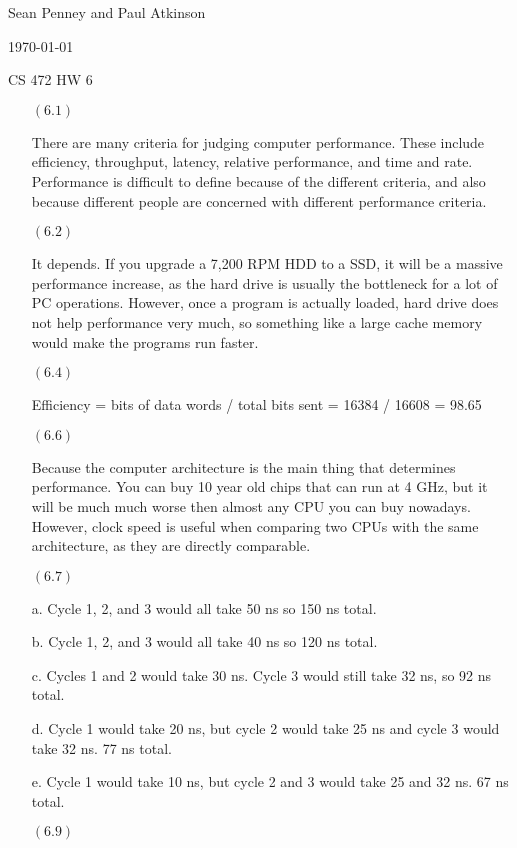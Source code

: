 \documentclass[letterpaper,10pt,titlepage]{article}
\def\name{Sean Penney and Paul Atkinson}
\begin{document}
\hfill \name

\hfill \today

\hfill CS 472 HW 6

\begin{enumerate}
\item[$(6.1)$] 

  There are many criteria for judging computer performance.
  These include efficiency, throughput, latency, relative performance, and time and rate.
  Performance is difficult to define because of the different criteria, and also because different people are concerned with different performance criteria.

\item[$(6.2)$]

  It depends. If you upgrade a 7,200 RPM HDD to a SSD, it will be a massive performance increase, as the hard drive is usually the bottleneck for a lot of PC operations.
  However, once a program is actually loaded, hard drive does not help performance very much, so something like a large cache memory would make the programs run faster.

\item[$(6.4)$]

  Efficiency = bits of data words / total bits sent = 16384 / 16608 = 98.65%
  
\item[$(6.6)$]

  Because the computer architecture is the main thing that determines performance. You can buy 10 year old chips that can run at 4 GHz, but it will be much much worse then 
  almost any CPU you can buy nowadays. However, clock speed is useful when comparing two CPUs with the same architecture, as they are directly comparable. 

\item[$(6.7)$]

  a.  Cycle 1, 2, and 3 would all take 50 ns so 150 ns total.
  
  b.  Cycle 1, 2, and 3 would all take 40 ns so 120 ns total.
  
  c.  Cycles 1 and 2 would take 30 ns.  Cycle 3 would still take 32 ns, so 92 ns total.
  
  d.  Cycle 1 would take 20 ns, but cycle 2 would take 25 ns and cycle 3 would take 32 ns.  77 ns total.
  
  e.  Cycle 1 would take 10 ns, but cycle 2 and 3 would take 25 and 32 ns.  67 ns total.
  
\item[$(6.9)$]


\end{enumerate}
\end{document}
